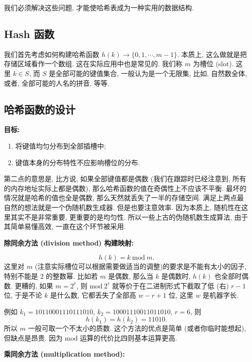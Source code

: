 \documentclass[a4paper]{ctexart}
\theoremstyle{definition}
\theoremstyle{definition}
\begin{document}
我们必须解决这些问题, 才能使哈希表成为一种实用的数据结构.

\subsection{Hash 函数}

我们首先考虑如何构建哈希函数 $h(k) \to \{0, 1, \cdots, m - 1\}$. 本质上, 
这么做就是把存储区域看作一个数组. 这在实际应用中也是常见的. 我们称 $m$ 为槽位 (slot). 
这里 $k \in S$, 而 $S$ 是全部可能的键值集合, 一般认为是一个无限集, 比如, 
自然数全体, 或者, 全部可能的人名的拼音, 等等.

\subsection{哈希函数的设计}

{\bf 目标:} 

\begin{enumerate}
\item 将键值均匀分布到全部插槽中;
\item 键值本身的分布特性不应影响槽位的分布. 
\end{enumerate}

第二点的意思是, 比方说, 如果全部键值都是偶数 (我们在跟踪时已经注意到, 
所有的内存地址实际上都是偶数), 那么哈希函数的值在奇偶性上不应该不平衡. 
最坏的情况就是哈希的值也全是偶数, 那么天然就丢失了一半的存储空间. 
满足上两点最自然的想法就是一个伪随机数生成器. 但是也要注意效率. 因为本质上, 
随机性在这里其实不是非常重要, 更重要的是均匀性. 所以一些上古的伪随机数生成算法, 
由于其简单易懂高效, 一直在这个环节被采用. 

{\bf 除同余方法 (division method) 构建映射:}

$$
h(k) = k ~\mathrm{mod}~ m.
$$
这里对 $m$ (注意实际槽位可以根据需要做适当的调整)的要求是不能有太小的因子, 
特别不能是 $2$ 的整数幂. 比如若 $m$ 是偶数, 那么当 $k$ 是偶数时, $h(k)$ 也全部时偶数. 
更糟的, 如果 $m = 2^r$, 则 $\mathrm{mod}~2^r$ 就等价于在二进制形式下截取了低 (右) $r - 1$ 位,
于是不论 $k$ 是什么数, 它都丢失了全部高 $w - r + 1$ 位, 这里 $w$ 是机器字长.

例如 $k_1 = 10110001110111010$, $k_2 = 10001110011011010$, $r = 6$, 则
$$
h(k_1) = h(k_2) = 11010.
$$
所以 $m$ 一般可取一个不太小的质数. 这个方法的优点是简单 (或者你临时能想起), 但缺点是昂贵. 
因为 $\mathrm{mod}$ 运算的代价比四则基本运算更高. 

{\bf 乘同余方法 (multiplication method):}
\end{document}
